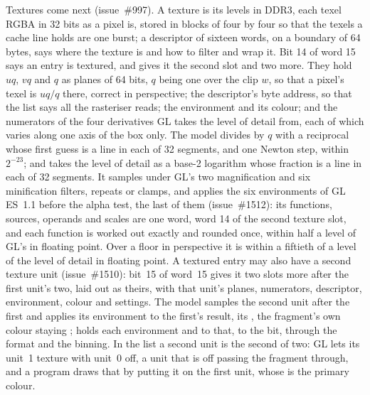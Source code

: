 \documentclass[journal,9pt]{IEEEtran}
\begin{document}
Textures come next (issue~\#997). A texture is its levels in DDR3,
each texel RGBA in 32 bits as a pixel is, stored in blocks of four by
four so that the texels a cache line holds are one burst; a
descriptor of sixteen words, on a boundary of 64 bytes, says where the
texture is and how to filter and wrap it. Bit 14 of word 15 says an
entry is textured, and gives it the second slot and two more. They
hold $uq$, $vq$ and $q$ as planes of 64 bits, $q$ being one over the
clip $w$, so that a pixel's texel is $uq/q$ there, correct in
perspective; the descriptor's byte address, so that the list says all
the rasteriser reads; the environment and its colour; and the
numerators of the four derivatives GL takes the level of detail from,
each of which varies along one axis of the box only. The model divides
by $q$ with a reciprocal whose first guess is a line in each of 32
segments, and one Newton step, within $2^{-23}$; and takes the level of
detail as a base-2 logarithm whose fraction is a line in each of 32
segments. It samples under GL's
two magnification and six minification filters, repeats or clamps, and
applies the six environments of GL ES~1.1 before the alpha test, the
last of them  (issue~\#1512): its functions, sources,
operands and scales are one word, word 14 of the second texture slot,
and each function is worked out exactly and rounded once, within half a
level of GL's in floating point.
Over a floor in perspective it is within a fiftieth of a level of the level of detail in floating point.
A textured entry may also have a second texture unit (issue~\#1510): bit~15
of word~15 gives it two slots more after the first unit's two, laid out
as theirs, with that unit's planes, numerators, descriptor, environment,
colour and  settings. The model samples the second unit
after the first and applies its environment to the first's result, its
, the fragment's own colour staying ;
 holds each
environment and  to that, to the bit, through the format
and the binning. In the list a second unit is the second of two: GL lets
its unit~1 texture with unit~0 off, a unit that is off passing the
fragment through, and a program draws that by putting it on the first
unit, whose  is the primary colour.
\end{document}

